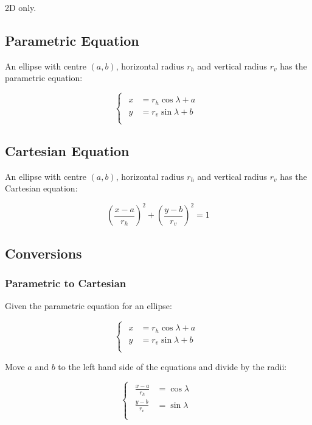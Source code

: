 \documentclass[a4paper,11pt]{report}
\begin{document}
2D only.

\subsection{Parametric Equation}

An ellipse with centre $(a, b)$, horizontal radius $r_h$ and vertical radius
$r_v$ has the parametric equation:

$$
\begin{cases}
\begin{aligned}
x & = r_h \cos{\lambda} + a \\
y & = r_v \sin{\lambda} + b \\
\end{aligned}
\end{cases}
$$

\subsection{Cartesian Equation}

An ellipse with centre $(a, b)$, horizontal radius $r_h$ and vertical radius
$r_v$ has the Cartesian equation:

$$
(\frac{x - a}{r_h})^2 + (\frac{y - b}{r_v})^2 = 1
$$

\subsection{Conversions}

\subsubsection{Parametric to Cartesian}

Given the parametric equation for an ellipse:

$$
\begin{cases}
\begin{aligned}
x & = r_h \cos{\lambda} + a \\
y & = r_v \sin{\lambda} + b \\
\end{aligned}
\end{cases}
$$

Move $a$ and $b$ to the left hand side of the equations and divide by the
radii:

$$
\begin{cases}
\begin{aligned}
\frac{x - a}{r_h} & = \cos{\lambda} \\
\frac{y - b}{r_v} & = \sin{\lambda} \\
\end{aligned}
\end{cases}
$$
\end{document}
